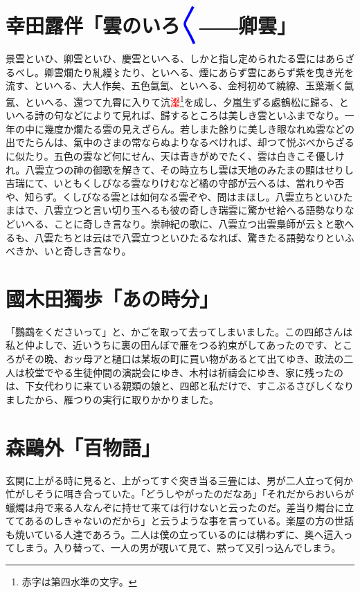 \documentclass{ujreport}
\begin{document}
\section{幸田露伴「雲のいろ\textcolor{blue}{〳〵}――卿雲」}

景雲といひ、卿雲といひ、慶雲といへる、しかと指し定められたる雲にはあらざるべし。卿雲爛たり糺縵〻たり、といへる、煙にあらず雲にあらず紫を曳き光を流す、といへる、大人作矣、五色氤氳、といへる、金柯初めて繞繚、玉葉漸く氤氳、といへる、還つて九霄に入りて沆\textcolor{red}{瀣}\footnote{赤字は第四水準の文字。}を成し、夕嵐生ずる處鶴松に歸る、といへる詩の句などによりて見れば、歸するところは美しき雲といふまでなり。一年の中に幾度か爛たる雲の見えざらん。若しまた餘りに美しき眼なれぬ雲などの出でたらんは、氣中のさまの常ならぬよりなるべければ、却つて悦ぶべからざるに似たり。五色の雲など何にせん、天は青きがめでたく、雲は白きこそ優しけれ。八雲立つの神の御歌を解きて、その時立ちし雲は天地のみたまの顯はせりし吉瑞にて、いともくしびなる雲なりけむなど橘の守部が云へるは、當れりや否や、知らず。くしびなる雲とは如何なる雲ぞや、問はまほし。八雲立ちといひたまはで、八雲立つと言い切り玉へるも彼の奇しき瑞雲に驚かせ給へる語勢なりなどいへる、ことに奇しき言なり。崇神紀の歌に、八雲立つ出雲梟師が云〻と歌へるも、八雲たちとは云はで八雲立つといひたるなれば、驚きたる語勢なりといふべきか、いと奇しき言なり。


\section{國木田獨歩「あの時分」}

「鸚鵡をくださいって」と、かごを取って去ってしまいました。この四郎さんは私と仲よしで、近いうちに裏の田んぼで雁をつる約束がしてあったのです、ところがその晩、おッ母アと樋口は某坂の町に買い物があるとて出てゆき、政法の二人は校堂でやる生徒仲間の演説会にゆき、木村は祈禱会にゆき、家に残ったのは、下女代わりに来ている親類の娘と、四郎と私だけで、すこぶるさびしくなりましたから、雁つりの実行に取りかかりました。


\section{森鷗外「百物語」}

玄関に上がる時に見ると、上がってすぐ突き当る三畳には、男が二人立って何か忙がしそうに咡き合っていた。「どうしやがったのだなあ」「それだからおいらが蠟燭は舟で来る人なんぞに持せて来ては行けないと云ったのだ。差当り燭台に立ててあるのしきゃないのだから」と云うような事を言っている。楽屋の方の世話も焼いている人達であろう。二人は僕の立っているのには構わずに、奥へ這入ってしまう。入り替って、一人の男が覗いて見て、黙って又引っ込んでしまう。
\end{document}
